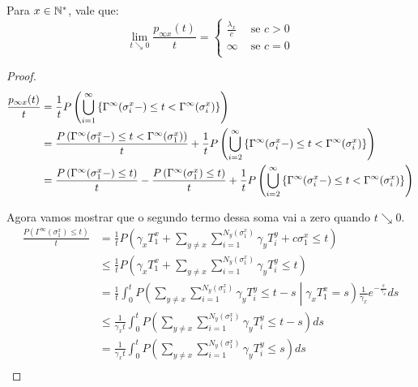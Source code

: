 \begin{proposicao}
  Para $x \in {\mathbb{N^*}}$, vale que:
  \label{prop:taxa-inf-x}
  \begin{displaymath}
    \lim_{t \searrow 0} \frac{p_{\infty x}(t)}{t} = \begin{cases}
      \frac{\lambda_x}{c} & \textrm{ se } c > 0 \\
      \infty & \textrm{ se } c = 0 \\
    \end{cases}
  \end{displaymath}
\end{proposicao}
\begin{proof}
  \begin{align}
    \frac{p_{\infty x}(t)}{t} &= \frac{1}{t} P \left( \bigcup_{i =
        1}^{\infty} \left\{ \Gamma^\infty (\sigma^x_i -) \leq t <
        \Gamma^\infty(\sigma^x_i) \right\} \right) \notag \\
    &= \frac{P \left( \Gamma^\infty (\sigma^x_1 -) \leq t <
      \Gamma^\infty(\sigma^x_1) \right)}{t} +
    \frac{1}{t} P \left( \bigcup_{i =
        2}^{\infty} \left\{ \Gamma^\infty (\sigma^x_i -) \leq t <
        \Gamma^\infty(\sigma^x_i) \right\} \right) \notag \notag \\
    \label{erros_taxa_inf}
    &= \frac{P \left( \Gamma^\infty (\sigma^x_1 -) \leq t \right)}{t} -
    \frac{P \left( \Gamma^\infty (\sigma^x_1) \leq t \right)}{t} +
    \frac{1}{t} P \left( \bigcup_{i =
        2}^{\infty} \left\{ \Gamma^\infty (\sigma^x_i -) \leq t <
        \Gamma^\infty(\sigma^x_i) \right\} \right)
  \end{align}

  Agora vamos mostrar que o segundo termo dessa soma vai a zero quando
  $t \searrow 0$.
  \begin{align*}
    \frac{P (\Gamma^\infty (\sigma^x_1) \leq t)}{t}
    &= \frac{1}{t} P \left(
      \gamma_x T^x_1 + 
      \sum_{y \neq x} \sum_{i = 1}^{N_y (\sigma^x_1)} \gamma_y T^y_i +
      c\sigma^x_1
      \leq t
    \right) \\
    &\leq \frac{1}{t} P \left(
      \gamma_x T^x_1 + 
      \sum_{y \neq x} \sum_{i = 1}^{N_y (\sigma^x_1)} \gamma_y T^y_i
      \leq t
    \right)\\
    &= \frac{1}{t} \int_0^t P \left(
      \sum_{y \neq x} \sum_{i = 1}^{N_y (\sigma^x_1)} \gamma_y T^y_i
      \leq t - s
      \middle\vert \gamma_x T^x_1 = s
    \right) \frac{1}{\gamma_x} e^{-\frac{s}{\gamma_x}} ds\\
    &\leq \frac{1}{\gamma_x t} \int_0^t P \left(
      \sum_{y \neq x} \sum_{i = 1}^{N_y (\sigma^x_1)} \gamma_y T^y_i
      \leq t - s
    \right) ds\\
    &= \frac{1}{\gamma_x t} \int_0^t P \left(
      \sum_{y \neq x} \sum_{i = 1}^{N_y (\sigma^x_1)} \gamma_y T^y_i
      \leq s
    \right) ds\\
  \end{align*}


\end{proof}
